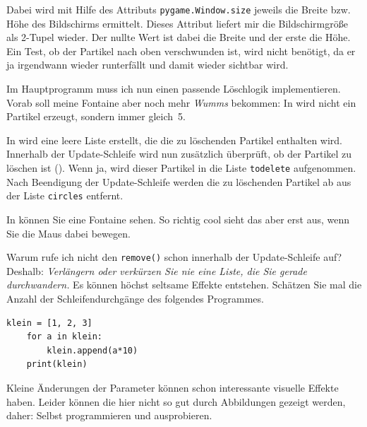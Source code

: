 Dabei wird mit Hilfe des Attributs \texttt{pygame.Window.size} jeweils die Breite bzw. Höhe des Bildschirms ermittelt. Dieses Attribut liefert mir die Bildschirmgröße als 2-Tupel wieder. Der nullte Wert ist dabei die Breite und der erste die Höhe. Ein Test, ob der Partikel nach oben verschwunden ist, wird nicht benötigt, da er ja irgendwann wieder runterfällt und damit wieder sichtbar wird.

\newpage
{}

Im Hauptprogramm muss ich nun einen passende Löschlogik implementieren. Vorab soll meine Fontaine aber noch mehr \emph{Wumms} bekommen: In  wird nicht ein Partikel erzeugt, sondern immer gleich~5.

In  wird eine leere Liste erstellt, die die zu löschenden Partikel enthalten wird. Innerhalb der Update-Schleife wird nun zusätzlich überprüft, ob der Partikel zu löschen ist (). Wenn ja, wird dieser Partikel in die Liste \texttt{todelete} aufgenommen. Nach Beendigung der Update-Schleife werden die zu löschenden Partikel ab  aus der Liste \texttt{circles} entfernt.

In  können Sie eine Fontaine sehen. So richtig cool sieht das aber erst aus, wenn Sie die Maus dabei bewegen.


Warum rufe ich nicht den \texttt{remove()} schon innerhalb der Update-Schleife auf? Deshalb: \emph{Verlängern oder verkürzen Sie nie eine Liste, die Sie gerade durchwandern.} Es können höchst seltsame Effekte entstehen. Schätzen Sie mal die Anzahl der Schleifendurchgänge des folgendes Programmes.

\begin{lstlisting}[firstnumber=1]
	klein = [1, 2, 3]
	for a in klein:
	    klein.append(a*10)
	print(klein)	
\end{lstlisting}

Kleine Änderungen der Parameter können schon interessante visuelle Effekte haben. Leider können die hier nicht so gut durch Abbildungen gezeigt werden, daher: Selbst programmieren und ausprobieren.


